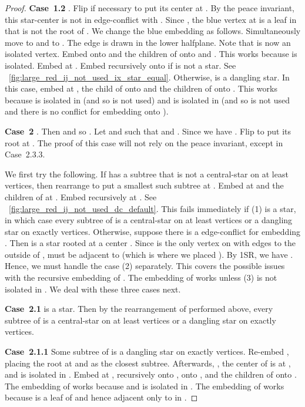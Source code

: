 \documentclass[11pt,a4paper,colorlinks=true,urlcolor=blue,citecolor=red]{article}
\theoremstyle{plain}
\newcommand{\case}[1]{\par\vspace{.5\baselineskip}\noindent\textbf{\sffamily Case~#1}}
\begin{document}
\begin{proof}
  \case{1.2} . Flip  if necessary to put its center
  at . By the peace invariant, this star-center is not in
  edge-conflict with . Since , the blue vertex at 
  is a leaf in  that is not the root of . We change the blue
  embedding as follows. Simultaneously move  to 
  and  to . The edge  is drawn in the lower
  halfplane. Note that  is now an isolated vertex.
  Embed  onto  and the children of  onto  and
  . This works because  is isolated. Embed 
  at . Embed  recursively onto  if  is not a star. See
  \figurename~\ref{fig:large_red_ij_not_used_ix_star_equal}. Otherwise,
   is a dangling star. In this case, embed  at , the child 
  of  onto  and the children of  onto . This
  works because  is isolated in  (and so  is not
  used) and  is isolated in  (and so  is not used
  and there is no conflict for embedding  onto ).

  \case{2} . Then
   and so . Let
   and  such that  and . Since
   we have . Flip  to put its root at
  . The proof of this case will not rely on the peace invariant,
  except in Case~2.3.3.

  We first try the following. If  has a subtree that is not a
  central-star on at least  vertices, then rearrange  to
  put a smallest such subtree at . Embed  at  and the
  children of  at . Embed  recursively at . See
  \figurename~\ref{fig:large_red_ij_not_used_dc_default}. This fails
  immediately if (1)  is a star, in which case every subtree of
   is a central-star on at least  vertices or a dangling star
  on exactly  vertices. Otherwise, suppose there is a
  edge-conflict for embedding . Then 
  is a star rooted at a center . Since  is the only vertex on
   with edges to the outside of ,  must be adjacent to
   (which is where we placed ). By 1SR, we have . Hence,
  we must handle the case (2)  separately.
  This covers the possible issues with the recursive embedding of .
  The embedding of  works unless (3)  is not isolated in
  . We deal with these three cases next.

  \case{2.1}  is a star. Then by the rearrangement of 
  performed above, every subtree of  is a central-star on at least
   vertices or a dangling star on exactly  vertices.

  \case{2.1.1} Some subtree  of  is a dangling star on exactly
   vertices. Re-embed , placing the root at  and 
  as the closest subtree. Afterwards, , the center of 
  is at , and  is isolated in . Embed  at , 
  recursively onto ,  onto , and the children of  onto
  . The embedding of  works because 
  and  is isolated in . The embedding of  works because
   is a leaf of  and hence adjacent only to  in .


\end{proof}
\end{document}
